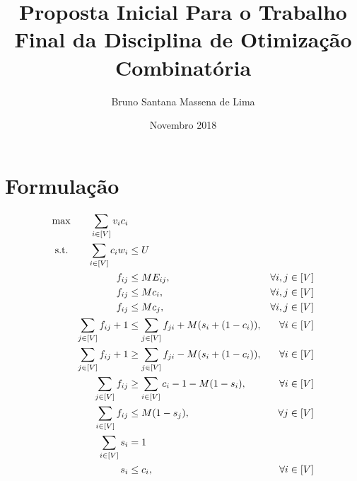 \documentclass[14pt]{extarticle}
\title{Proposta Inicial Para o Trabalho Final da Disciplina de Otimização Combinatória}
\author{Bruno Santana Massena de Lima }
\date{Novembro 2018}
\begin{document}
\maketitle

\section{Formulação}

\begin{gather*}
\begin{aligned}
\textup{max}\qquad \sum_{i\in[V]} v_i c_i\\
\textup{s.t.}\qquad \sum_{i \in [V]} c_i w_i     &\leq U\\
                    f_{ij}                      &\leq M E_{ij}, & \forall i,j \in [V]\\
                    f_{ij}                      &\leq M c_i,    & \forall i,j \in [V]\\
                    f_{ij}                      &\leq M c_j,    & \forall i,j \in [V]\\
                    \sum_{j \in [V]} f_{ij} + 1 &\leq \sum_{j \in [V]} f_{ji} + M(s_i + (1 - c_i)), & \forall i \in [V]\\
                    \sum_{j \in [V]} f_{ij} + 1 &\geq \sum_{j \in [V]} f_{ji} - M(s_i + (1 - c_i)), & \forall i \in [V]\\
                    \sum_{j \in [V]} f_{ij}     &\geq \sum_{i \in [V]} c_i - 1 - M(1 - s_i), & \forall i \in [V]\\
                    \sum_{i \in [V]} f_{ij}     &\leq M(1 - s_j), & \forall j \in [V]\\
                    \sum_{i \in [V]} s_i        &= 1\\
                    s_i                         &\leq c_i, & \forall i \in [V]\\
\end{aligned}
\end{gather*}
\end{document}
